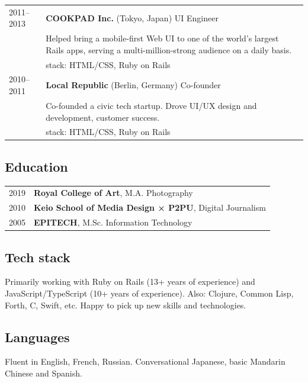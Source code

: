 \documentclass[a4paper,11pt]{article}
\def\companystrut{\rule{0pt}{1.2\normalbaselineskip}}
\def\descriptionstrut{\rule{0pt}{0.9\normalbaselineskip}}
\begin{document}
\begin{tabular}{ p{4.5em} p{41.5em} }
  2011–2013\companystrut & \textbf{COOKPAD Inc.} (Tokyo, Japan) UI Engineer\\
           & \descriptionstrut Helped bring a mobile-first Web UI to
             one of the world’s largest Rails apps, serving a multi-million-strong audience on
             a daily basis.\\
           & {\sc stack:} HTML/CSS, Ruby on Rails\\

  2010–2011\companystrut & \textbf{Local Republic} (Berlin, Germany) Co-founder\\
           & \descriptionstrut Co-founded a civic tech startup. Drove UI/UX design and development,
             customer success.\\
           & {\sc stack:} HTML/CSS, Ruby on Rails\\
\end{tabular}

\subsection*{Education}

\begin{tabular}{ p{4.5em} p{30em} }
  2019 & \textbf{Royal College of Art}, M.A. Photography\\
  2010\descriptionstrut & \textbf{Keio School of Media Design × P2PU}, Digital Journalism\\
  2005\descriptionstrut & \textbf{EPITECH}, M.Sc. Information Technology\\
\end{tabular}

\subsection*{Tech stack}

Primarily working with Ruby on Rails (13+ years of experience) and
JavaScript/TypeScript (10+ years of experience). Also: Clojure, Common Lisp,
Forth, C, Swift, etc. Happy to pick up new skills and technologies.

\subsection*{Languages}

Fluent in English, French, Russian. Conversational Japanese, basic Mandarin
Chinese and Spanish.
\end{document}
